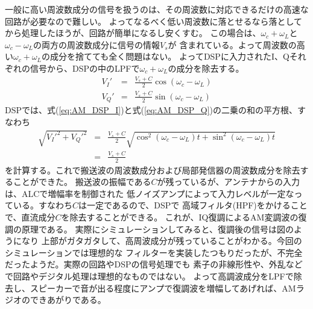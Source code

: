 一般に高い周波数成分の信号を扱うのは、その周波数に対応できるだけの高速な回路が必要なので難しい。
よってなるべく低い周波数に落とせるなら落としてから処理したほうが、回路が簡単になるし安くすむ。
この場合は、$\omega_c + \omega_L$と$\omega_c - \omega_L$の両方の周波数成分に信号の情報$V_s$が
含まれている。よって周波数の高い$\omega_c + \omega_L$の成分を捨てても全く問題はない。
よってDSPに入力されたI、Qそれぞれの信号から、DSPの中のLPFで$\omega_c + \omega_L$の成分を除去する。
\begin{eqnarray}
V_I' &=& \frac{V_s+C}{2}\cos(\omega_c - \omega_L) \label{eq:AM_DSP_I}\\
V_Q' &=& \frac{V_s+C}{2}\sin(\omega_c - \omega_L) \label{eq:AM_DSP_Q}
\end{eqnarray}
DSPでは、式(\ref{eq:AM_DSP_I})と式(\ref{eq:AM_DSP_Q})の二乗の和の平方根、すなわち
\begin{eqnarray}
\sqrt{V_I'^2 + V_Q'^2} &=& \frac{V_s+C}{2}\sqrt{\cos^2(\omega_c - \omega_L)t + \sin^2(\omega_c - \omega_L)t }\\
&=& \frac{V_s+C}{2} 
\end{eqnarray}
を計算する。これで搬送波の周波数成分および局部発信器の周波数成分を除去することができた。
搬送波の振幅である$C$が残っているが、アンテナからの入力は、ALCで増幅率を制御された
低ノイズアンプによって入力レベルが一定なっている。すなわち$C$は一定であるので、DSPで
高域フィルタ(HPF)をかけることで、直流成分$C$を除去することができる。
これが、IQ復調によるAM変調波の復調の原理である。
実際にシミュレーションしてみると、復調後の信号は図\cite{fig:demodulation}のようになり
上部がガタガタして、高周波成分が残っていることがわかる。今回のシミュレーションでは理想的な
フィルターを実装したつもりだったが、不完全だったようだ。実際の回路やDSPの信号処理でも
素子の非線形性や、外乱などで回路やデジタル処理は理想的なものではない。
よって高調波成分をLPFで除去し、スピーカーで音が出る程度にアンプで復調波を増幅してあげれば、AMラジオのできあがりである。
